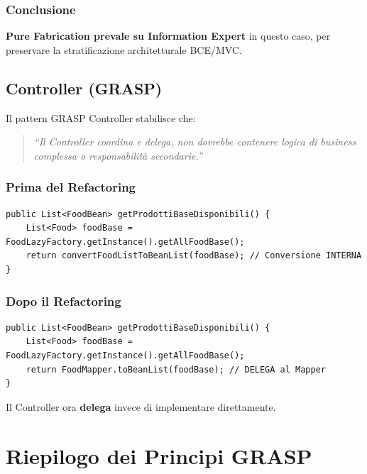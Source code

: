 \documentclass[12pt,a4paper]{article}
\begin{document}
\subsubsection{Conclusione}

\textbf{Pure Fabrication prevale su Information Expert} in questo caso, per preservare la stratificazione architetturale BCE/MVC.

\subsection{Controller (GRASP)}

Il pattern GRASP Controller stabilisce che:
\begin{quote}
\textit{``Il Controller coordina e delega, non dovrebbe contenere logica di business complessa o responsabilità secondarie.''}
\end{quote}

\subsubsection{Prima del Refactoring}

\begin{lstlisting}[style=javastyle]
public List<FoodBean> getProdottiBaseDisponibili() {
    List<Food> foodBase = FoodLazyFactory.getInstance().getAllFoodBase();
    return convertFoodListToBeanList(foodBase); // Conversione INTERNA
}
\end{lstlisting}

\subsubsection{Dopo il Refactoring}

\begin{lstlisting}[style=javastyle]
public List<FoodBean> getProdottiBaseDisponibili() {
    List<Food> foodBase = FoodLazyFactory.getInstance().getAllFoodBase();
    return FoodMapper.toBeanList(foodBase); // DELEGA al Mapper
}
\end{lstlisting}

Il Controller ora \textbf{delega} invece di implementare direttamente.

\section{Riepilogo dei Principi GRASP}
\end{document}
